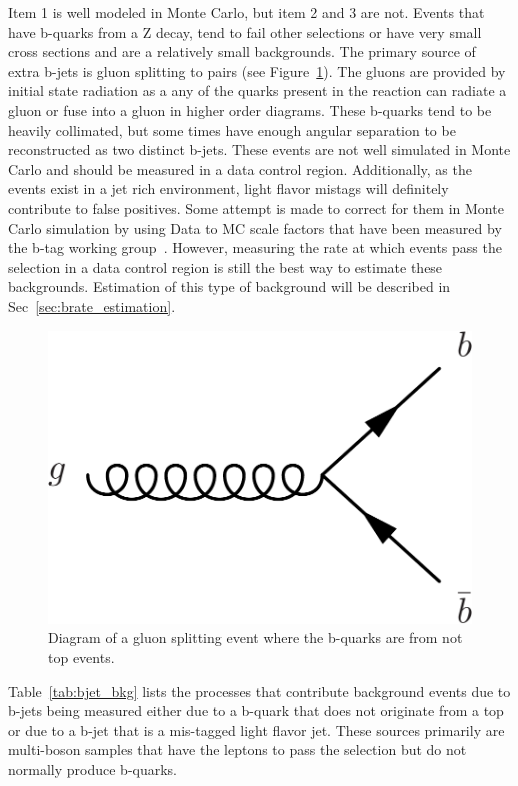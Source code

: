 Item 1 is well modeled in Monte Carlo, but item 2 and 3 are not. Events that have b-quarks from a Z decay, tend to fail other selections or have very small cross sections and are a relatively small backgrounds. The primary source of extra b-jets is gluon splitting to \bbbar pairs (see Figure~\ref{fig:gluon_splitting}). The gluons are provided by initial state radiation as a any of the quarks present in the reaction can radiate a gluon or fuse into a gluon in higher order diagrams. These b-quarks tend to be heavily collimated, but some times have enough angular separation to be reconstructed as two distinct b-jets. These events are not well simulated in Monte Carlo and should be measured in a data control region. Additionally, as the \ttZ events exist in a jet rich environment, light flavor mistags will definitely contribute to false positives. Some attempt is made to correct for them in Monte Carlo simulation by using Data to MC scale factors that have been measured by the b-tag working group~\cite{BTV11003}. However, measuring the rate at which events pass the selection in a data control region is still the best way to estimate these backgrounds. Estimation of this type of background will be described in Sec~\ref{sec:brate_estimation}. \\

			\begin{figure}[h]
\begin{center}
\includegraphics[width=0.48\linewidth]{Figs/gluon_splitting.pdf}
\caption{\label{fig:gluon_splitting}
Diagram of a gluon splitting event where the b-quarks are from not top events.
}
\end{center}
\end{figure} 


		Table~\ref{tab:bjet_bkg} lists the processes that contribute background events due to b-jets being measured either due to a b-quark that does not originate from a top or due to a b-jet that is a mis-tagged light flavor jet. These sources primarily are multi-boson samples that have the leptons to pass the selection but do not normally produce b-quarks.

